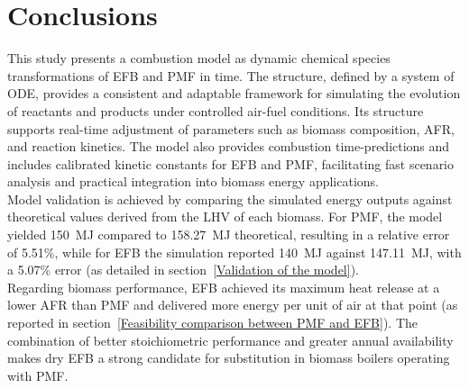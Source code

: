 \documentclass[preprint,12pt]{elsarticle}
\begin{document}
{%


\section{Conclusions}\label{conclusions}

This study presents a combustion model as dynamic chemical species transformations of EFB and PMF in time. The structure, defined by a system of ODE, provides a consistent and adaptable framework for simulating the evolution of reactants and products under controlled air-fuel conditions. Its structure supports real-time adjustment of parameters such as biomass composition, AFR, and reaction kinetics. The model also provides combustion time-predictions and includes calibrated kinetic constants for EFB and PMF, facilitating fast scenario analysis and practical integration into biomass energy applications. \\

Model validation is achieved by comparing the simulated energy outputs against theoretical values derived from the LHV of each biomass. For PMF, the model yielded 150~MJ compared to 158.27~MJ theoretical, resulting in a relative error of 5.51\%, while for EFB the simulation reported 140~MJ against 147.11~MJ, with a 5.07\% error (as detailed in section~\ref{Validation of the model}).\\

Regarding biomass performance, EFB achieved its maximum heat release at a lower AFR than PMF and delivered more energy per unit of air at that point (as reported in section~\ref{Feasibility comparison between PMF and EFB}). The combination of better stoichiometric performance and greater annual availability makes dry EFB a strong candidate for substitution in biomass boilers operating with PMF.\\


}
\end{document}
